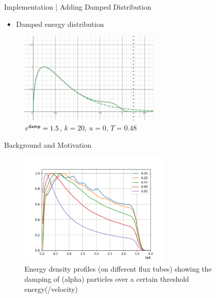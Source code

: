     \begin{frame}{Implementation | Adding Damped Distribution}
        \begin{itemize}
            \item  Damped energy distribution
        \end{itemize}
        \begin{figure}
            \centering
            \includegraphics[width = 0.6\textwidth]{2 - implementation/2 - adding damped backgrounds/images/example energy distribution.png}
            \caption{$v^{\sf damp} = 1.5$, $k = 20$, $u = 0$, $T = 0.48$}
        \end{figure}
    \end{frame}
    
    \begin{frame}{Background and Motivation}    
        \begin{figure}
            \centering
            \includegraphics[width = 0.65\textwidth]{1 - background and motivation/images/Experimental Damped Distributions.png}
            \caption{Energy density profiles (on different flux tubes) showing the damping of (alpha) particles over a certain threshold energy(/velocity)}
        \end{figure}
    \end{frame}
    
